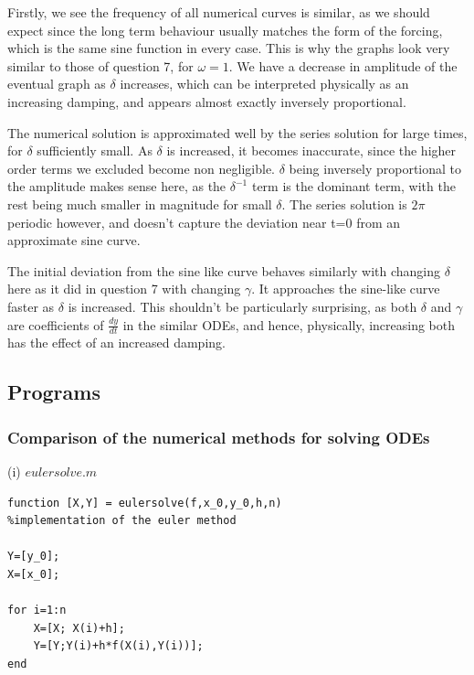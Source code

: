 \documentclass[10pt,a4paper]{report}
\begin{document}
Firstly, we see the frequency of all numerical curves is similar, as we should expect since the long term behaviour usually matches the form of the forcing, which is the same sine function in every case. This is why the graphs look very similar to those of question 7, for $\omega=1$. We have a decrease in amplitude of the eventual graph as $\delta$ increases, which can be interpreted physically as an increasing damping, and appears almost exactly inversely proportional. \par
\vspace{0.3cm}
The numerical solution is approximated well by the series solution for large times, for $\delta$ sufficiently small. As $\delta$ is increased, it becomes inaccurate, since the higher order terms we excluded become non negligible. $\delta$ being inversely proportional to the amplitude makes sense here, as the $\delta^{-1}$ term is the dominant term, with the rest being much smaller in magnitude for small $\delta$. The series solution is $2\pi$ periodic however, and doesn't capture the deviation near t=0 from an approximate sine curve.\par
\vspace{0.3cm}
The initial deviation from the sine like curve behaves similarly with changing $\delta$ here as it did in question 7 with changing $\gamma$. It approaches the sine-like curve faster as $\delta$ is increased. This shouldn't be particularly surprising, as both $\delta$ and $\gamma$ are coefficients of $\frac{dy}{dt}$ in the similar ODEs, and hence, physically, increasing both has the effect of an increased damping.




\newpage

\subsection*{Programs}

\vspace{1cm}

\subsubsection*{Comparison of the numerical methods for solving ODEs}

\vspace{0.5cm}

(i) $eulersolve.m$
\begin{verbatim}
function [X,Y] = eulersolve(f,x_0,y_0,h,n)
%implementation of the euler method

Y=[y_0];
X=[x_0];

for i=1:n
    X=[X; X(i)+h];
    Y=[Y;Y(i)+h*f(X(i),Y(i))];
end
\end{verbatim}
\vspace{0.5cm}
\end{document}
